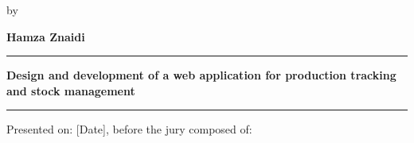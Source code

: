 \begin{titlepage}
{\large by}
\vspace{0.3cm}

{\Large \textbf{Hamza Znaidi}}

\vspace{0.8cm}

\rule{12cm}{3pt}

\vspace{0.3cm}

{\Large \textbf{Design and development of a web application for production tracking and stock management}}

\vspace{0.3cm}

\rule{8cm}{5pt}

\vspace{1cm}

{\large Presented on: [Date], before the jury composed of:}

\vspace{0.5cm}

\renewcommand{\arraystretch}{1}


\vfill

\end{titlepage}